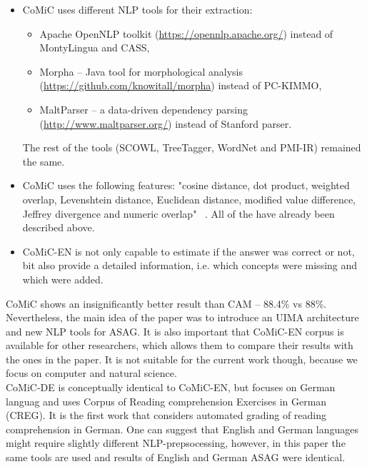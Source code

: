 \begin{itemize}
\item CoMiC uses different NLP tools for their extraction:
\begin{itemize}
\item Apache OpenNLP toolkit (\url{https://opennlp.apache.org/}) instead of MontyLingua and CASS,
\item Morpha -- Java tool for morphological analysis (\url{https://github.com/knowitall/morpha}) instead of PC-KIMMO,
\item MaltParser -- a data-driven dependency parsing (\url{http://www.maltparser.org/}) instead of Stanford parser.
\end{itemize}
The rest of the tools (SCOWL, TreeTagger, WordNet and PMI-IR) remained the same.
\item CoMiC uses the following features: "cosine distance, dot product, weighted overlap, Levenshtein distance, Euclidean distance, modified value difference, Jeffrey divergence and numeric overlap" ~\cite{CoMiC-EN}. All of the have already been described above.
\item CoMiC-EN is not only capable to estimate if the answer was correct or not, bit also provide a detailed information, i.e. which concepts were missing and which were added.
\end{itemize} 

CoMiC shows an insignificantly better result than CAM -- 88.4\% vs 88\%. Nevertheless, the main idea of the paper was to introduce an UIMA architecture and new NLP tools for ASAG. It is also important that CoMiC-EN corpus is available for other researchers, which allows them to compare their results with the ones in the paper. It is not suitable for the current work though, because we focus on computer and natural science.\\

CoMiC-DE is conceptually identical to CoMiC-EN, but focuses on German languag and uses Corpus of Reading comprehension Exercises
in German (CREG). It is the first work that considers automated grading of reading comprehension in German. One can suggest that English and German languages might require slightly different NLP-prepsocessing, however, in this paper the same tools are used and results of English and German ASAG were identical.\\

